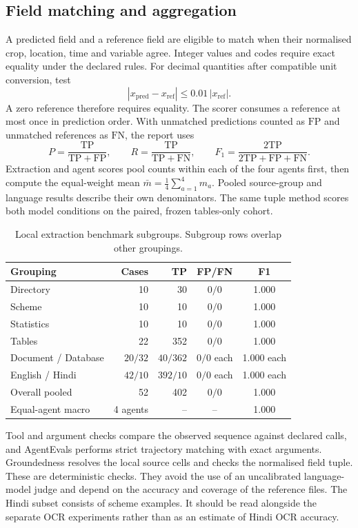 \documentclass[11pt,a4paper]{article}
\newcommand{\tp}{\mathrm{TP}}
\newcommand{\fp}{\mathrm{FP}}
\newcommand{\fn}{\mathrm{FN}}
\begin{document}
\subsection{Field matching and aggregation}
A predicted field and a reference field are eligible to match when their normalised crop, location, time and variable agree. Integer values and codes require exact equality under the declared rules. For decimal quantities after compatible unit conversion, test
\[
|x_{\mathrm{pred}}-x_{\mathrm{ref}}|\leq 0.01\,|x_{\mathrm{ref}}|.
\]
A zero reference therefore requires equality. The scorer consumes a reference at most once in prediction order. With unmatched predictions counted as \(\fp\) and unmatched references as \(\fn\), the report uses
\[
P=\frac{\tp}{\tp+\fp},\qquad
R=\frac{\tp}{\tp+\fn},\qquad
F_1=\frac{2\tp}{2\tp+\fp+\fn}.
\]
Extraction and agent scores pool counts within each of the four agents first, then compute the equal-weight mean \(\bar m=\frac14\sum_{a=1}^{4}m_a\). Pooled source-group and language results describe their own denominators. The same tuple method scores both model conditions on the paired, frozen tables-only cohort.

\begin{table}[!ht]
\small
\caption{Local extraction benchmark subgroups. Subgroup rows overlap other groupings.}
\label{tab:subgroups}
\begin{tabularx}{\linewidth}{@{}Yrrcc@{}}
\toprule
Grouping & Cases & TP & FP/FN & F1\\ \midrule
Directory & 10 & 30 & \(0/0\) & 1.000\\
Scheme & 10 & 10 & \(0/0\) & 1.000\\
Statistics & 10 & 10 & \(0/0\) & 1.000\\
Tables & 22 & 352 & \(0/0\) & 1.000\\
Document / Database & \(20/32\) & \(40/362\) & \(0/0\) each & 1.000 each\\
English / Hindi & \(42/10\) & \(392/10\) & \(0/0\) each & 1.000 each\\
Overall pooled & 52 & 402 & \(0/0\) & 1.000\\
Equal-agent macro & 4 agents & -- & -- & 1.000\\
\bottomrule
\end{tabularx}
\end{table}

Tool and argument checks compare the observed sequence against declared calls, and AgentEvals performs strict trajectory matching with exact arguments. Groundedness resolves the local source cells and checks the normalised field tuple. These are deterministic checks. They avoid the use of an uncalibrated language-model judge and depend on the accuracy and coverage of the reference files. The Hindi subset consists of scheme examples. It should be read alongside the separate OCR experiments rather than as an estimate of Hindi OCR accuracy.
\end{document}
